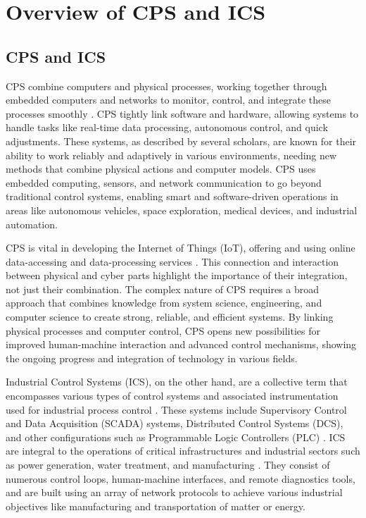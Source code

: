 \section{Overview of CPS and ICS}\label{sec:overview}

\subsection{CPS and ICS}
CPS combine computers and physical processes, working together through embedded computers and networks to monitor, control, and integrate these processes smoothly \cite{2,140,147}. CPS tightly link software and hardware, allowing systems to handle tasks like real-time data processing, autonomous control, and quick adjustments\cite{3}. These systems, as described by several scholars, are known for their ability to work reliably and adaptively in various environments, needing new methods that combine physical actions and computer models\cite{1}. CPS uses embedded computing, sensors, and network communication to go beyond traditional control systems, enabling smart and software-driven operations in areas like autonomous vehicles, space exploration, medical devices, and industrial automation\cite{5,208}. 

CPS is vital in developing the Internet of Things (IoT), offering and using online data-accessing and data-processing services \cite{202}. This connection and interaction between physical and cyber parts highlight the importance of their integration, not just their combination\cite{2}. The complex nature of CPS requires a broad approach that combines knowledge from system science, engineering, and computer science to create strong, reliable, and efficient systems\cite{4}. By linking physical processes and computer control, CPS opens new possibilities for improved human-machine interaction and advanced control mechanisms, showing the ongoing progress and integration of technology in various fields\cite{6}.

Industrial Control Systems (ICS), on the other hand, are a collective term that encompasses various types of control systems and associated instrumentation used for industrial process control \cite{148,149}. These systems include Supervisory Control and Data Acquisition (SCADA) systems, Distributed Control Systems (DCS), and other configurations such as Programmable Logic Controllers (PLC) \cite{150,151,152,153,154}. ICS are integral to the operations of critical infrastructures and industrial sectors such as power generation, water treatment, and manufacturing \cite{155,156}. They consist of numerous control loops, human-machine interfaces, and remote diagnostics tools, and are built using an array of network protocols to achieve various industrial objectives like manufacturing and transportation of matter or energy\cite{7}.

